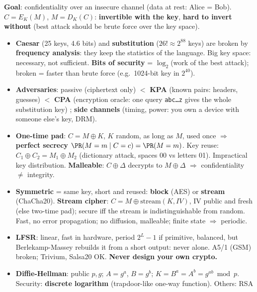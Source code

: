 \begin{recapbox}[title={Exam-ready recap --- Lecture 5: Applied cryptography}]
\textbf{Goal}: confidentiality over an insecure channel (data at rest: Alice = Bob).
$C = E_K(M)$, $M = D_K(C)$: \textbf{invertible with the key}, \textbf{hard to invert without}
(best attack should be brute force over the key space).
\begin{itemize}
  \item \textbf{Caesar} (25 keys, 4.6 bits) and \textbf{substitution} ($26! \approx 2^{88}$ keys)
        are broken by \textbf{frequency analysis}: they keep the statistics of the language. Big
        key space: necessary, not sufficient. \textbf{Bits of security} = $\log_2$(work of the
        best attack); broken = faster than brute force (e.g.\ 1024-bit key in $2^{40}$).
  \item \textbf{Adversaries}: passive (ciphertext only) $<$ \textbf{KPA} (known pairs: headers,
        guesses) $<$ \textbf{CPA} (encryption oracle: one query \texttt{abc\ldots z} gives the whole
        substitution key) ; \textbf{side channels} (timing, power: you own a device with someone
        else's key, DRM).
  \item \textbf{One-time pad}: $C = M \oplus K$, $K$ random, as long as $M$, used once
        $\Rightarrow$ \textbf{perfect secrecy} $\PR(M=m \mid C=c) = \PR(M=m)$. Key reuse:
        $C_1 \oplus C_2 = M_1 \oplus M_2$ (dictionary attack, spaces 00 vs letters 01).
        Impractical key distribution. \textbf{Malleable}: $C \oplus \Delta$ decrypts to $M \oplus
        \Delta$ $\Rightarrow$ confidentiality $\neq$ integrity.
  \item \textbf{Symmetric} = same key, short and reused: \textbf{block} (AES) or \textbf{stream}
        (ChaCha20). \textbf{Stream cipher}: $C = M \oplus \mathrm{stream}(K, IV)$, IV public and
        fresh (else two-time pad); secure iff the stream is indistinguishable from random. Fast,
        no error propagation; no diffusion, malleable; finite state $\Rightarrow$ periodic.
  \item \textbf{LFSR}: linear, fast in hardware, period $2^L-1$ if primitive, balanced, but
        Berlekamp-Massey rebuilds it from a short output: never alone. A5/1 (GSM) broken; Trivium,
        Salsa20 OK. \textbf{Never design your own crypto.}
  \item \textbf{Diffie-Hellman}: public $p, g$; $A = g^a$, $B = g^b$; $K = B^a = A^b = g^{ab} \bmod
        p$. Security: \textbf{discrete logarithm} (trapdoor-like one-way function). Others: RSA

\end{itemize}
\end{recapbox}
